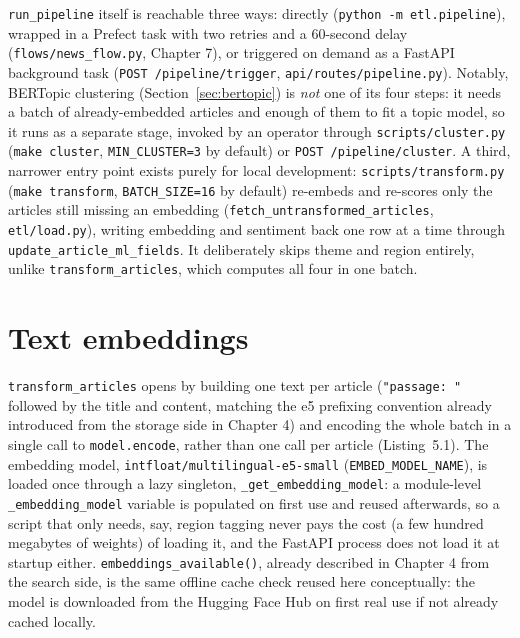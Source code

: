 \texttt{run\_pipeline} itself is reachable three ways: directly (\texttt{python -m etl.pipeline}), wrapped in a Prefect task with two retries and a 60-second delay (\texttt{flows/news\_flow.py}, Chapter 7), or triggered on demand as a FastAPI background task (\texttt{POST /pipeline/trigger}, \texttt{api/routes/pipeline.py}). Notably, BERTopic clustering (Section~\ref{sec:bertopic}) is \emph{not} one of its four steps: it needs a batch of already-embedded articles and enough of them to fit a topic model, so it runs as a separate stage, invoked by an operator through \texttt{scripts/\allowbreak cluster.py} (\texttt{make cluster}, \texttt{MIN\_CLUSTER=3} by default) or \texttt{POST /pipeline/cluster}. A third, narrower entry point exists purely for local development: \texttt{scripts/\allowbreak transform.py} (\texttt{make transform}, \texttt{BATCH\_SIZE=16} by default) re-embeds and re-scores only the articles still missing an embedding (\texttt{fetch\_\allowbreak untransformed\_articles}, \texttt{etl/\allowbreak load.py}), writing embedding and sentiment back one row at a time through \texttt{update\_\allowbreak article\_ml\_fields}. It deliberately skips theme and region entirely, unlike \texttt{transform\_articles}, which computes all four in one batch.

\section{Text embeddings}
\label{sec:embeddings}
\texttt{transform\_articles} opens by building one text per article (\texttt{"passage: "} followed by the title and content, matching the e5 prefixing convention already introduced from the storage side in Chapter 4) and encoding the whole batch in a single call to \texttt{model.encode}, rather than one call per article (Listing~5.1). The embedding model, \texttt{intfloat/\allowbreak multilingual-e5-small} (\texttt{EMBED\_MODEL\_NAME}), is loaded once through a lazy singleton, \texttt{\_get\_embedding\_model}: a module-level \texttt{\_embedding\_model} variable is populated on first use and reused afterwards, so a script that only needs, say, region tagging never pays the cost (a few hundred megabytes of weights) of loading it, and the FastAPI process does not load it at startup either. \texttt{embeddings\_available()}, already described in Chapter 4 from the search side, is the same offline cache check reused here conceptually: the model is downloaded from the Hugging Face Hub on first real use if not already cached locally.

